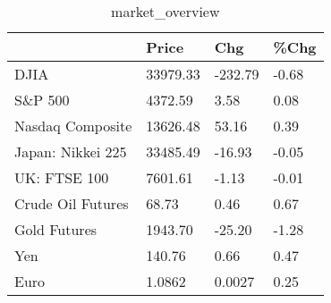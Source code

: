 \documentclass{article}%
\begin{document}
%


\begin{table}[htbp]%
\caption{market\_overview}%
\centering%
\begin{adjustbox}{width=1\textwidth}%
\begin{tabular}{llll}
\toprule
                  &    Price &     Chg &  \%Chg \\
\midrule
             DJIA & 33979.33 & -232.79 & -0.68 \\
          S\&P 500 &  4372.59 &    3.58 &  0.08 \\
 Nasdaq Composite & 13626.48 &   53.16 &  0.39 \\
Japan: Nikkei 225 & 33485.49 &  -16.93 & -0.05 \\
     UK: FTSE 100 &  7601.61 &   -1.13 & -0.01 \\
Crude Oil Futures &    68.73 &    0.46 &  0.67 \\
     Gold Futures &  1943.70 &  -25.20 & -1.28 \\
              Yen &   140.76 &    0.66 &  0.47 \\
             Euro &   1.0862 &  0.0027 &  0.25 \\
\bottomrule
\end{tabular}
%
\end{adjustbox}%
\end{table}

%
\end{document}
